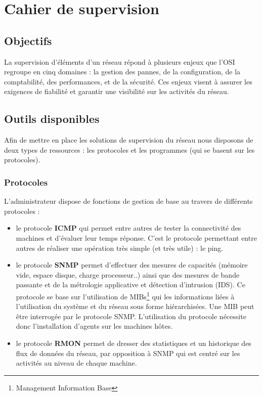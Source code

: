 \documentclass[a4paper]{article}
\begin{document}
\section{Cahier de supervision}

\subsection{Objectifs}
La supervision d'éléments d'un réseau répond à plusieurs enjeux que l'OSI regroupe en cinq domaines : la gestion des pannes, de la configuration, de la comptabilité, des performances, et de la sécurité. Ces enjeux visent à assurer les exigences de fiabilité et garantir une visibilité sur les activités du réseau.  

\subsection{Outils disponibles}

Afin de mettre en place les solutions de supervision du réseau nous disposons de deux types de ressources : les protocoles et les programmes (qui se basent sur les protocoles).\\ 

\subsubsection{Protocoles}

L'administrateur dispose de fonctions de gestion de base au travers de différents protocoles :
\begin{itemize}
\item le protocole \textbf{ICMP} qui permet entre autres de tester la connectivité des machines et d'évaluer leur temps réponse. C'est le protocole permettant entre autres de réaliser une opération très simple (et très utile) : le ping. 
\item le protocole \textbf{SNMP} permet d'effectuer des mesures de capacités (mémoire vide, espace disque, charge processeur..) ainsi que des mesures de bande passante et de la métrologie applicative et détection d'intrusion (IDS). Ce protocole se base sur l'utilisation de MIBs\footnote{Management Information Base} qui les informations liées à l'utilisation du système et du réseau sous forme hiérarchisées. Une MIB peut être interrogée par le protocole SNMP. L'utilisation du protocole nécessite donc l'installation d'agents sur les machines hôtes.
\item le protocole \textbf{RMON} permet de dresser des statistiques et un historique des flux de données du réseau, par opposition à SNMP qui est centré sur les activités au niveau de chaque machine.
\end{itemize}
\end{document}
